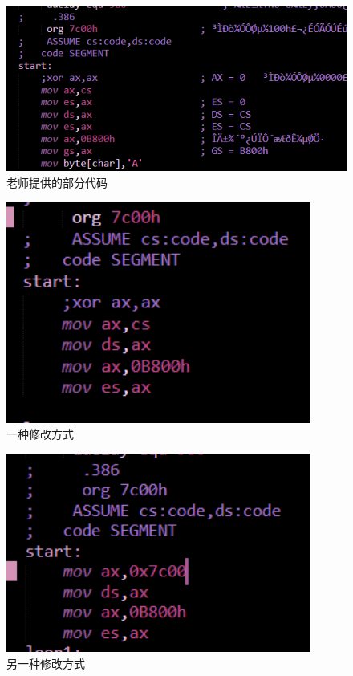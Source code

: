 \documentclass[12pt]{article}
\begin{document}
		\begin{figure}[H]
			\centering
			\includegraphics[width=14cm]{./figures/teachercode.png}
			\caption{老师提供的部分代码} 
		\end{figure}	

		\begin{figure}[H]
			\centering
			\includegraphics[width=10cm]{./figures/alter1.png}
			\caption{一种修改方式} 
		\end{figure}	


		\begin{figure}[H]
			\centering
			\includegraphics[width=10cm]{./figures/alter2.png}
			\caption{另一种修改方式} 
		\end{figure}	
\end{document}
